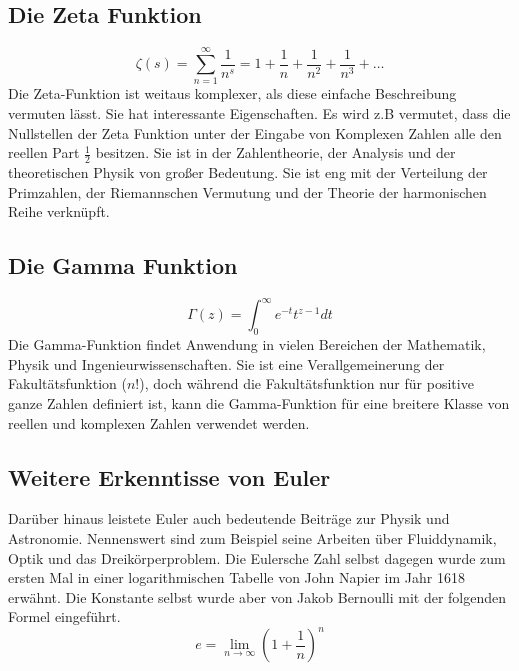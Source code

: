 \subsection{Die Zeta Funktion}
    \[\zeta(s) = \sum_{n=1}^{\infty} \frac{1}{n^s} = 1 + \frac{1}{n} + \frac{1}{n^2} + \frac{1}{n^3} + \dots \]
Die Zeta-Funktion ist weitaus komplexer, als diese einfache Beschreibung vermuten lässt. Sie hat interessante Eigenschaften. Es wird z.B vermutet, dass die Nullstellen der Zeta Funktion unter der Eingabe von Komplexen Zahlen alle den reellen Part $\frac{1}{2}$ besitzen. Sie ist in der Zahlentheorie, der Analysis und der theoretischen Physik von großer Bedeutung. Sie ist eng mit der Verteilung der Primzahlen, der Riemannschen Vermutung und der Theorie der harmonischen Reihe verknüpft.
\subsection{Die Gamma Funktion}
\[ \Gamma(z) = \int_0^\infty e^{-t} t^{z-1} dt \] 
Die Gamma-Funktion findet Anwendung in vielen Bereichen der Mathematik, Physik und Ingenieurwissenschaften. Sie ist eine Verallgemeinerung der Fakultätsfunktion ($n!$), doch während die Fakultätsfunktion nur für positive ganze Zahlen definiert ist, kann die Gamma-Funktion für eine breitere Klasse von reellen und komplexen Zahlen verwendet werden.
\subsection{Weitere Erkenntisse von Euler}
\par Darüber hinaus leistete Euler auch bedeutende Beiträge zur Physik und Astronomie. Nennenswert sind zum Beispiel seine Arbeiten über Fluiddynamik, Optik und das Dreikörperproblem. Die Eulersche Zahl selbst dagegen wurde zum ersten Mal in einer logarithmischen Tabelle von John Napier im Jahr 1618 erwähnt. Die Konstante selbst wurde aber von Jakob Bernoulli mit der folgenden Formel eingeführt. \[
e = \lim_{n\to\infty}(1+\frac{1}{n})^n \]
